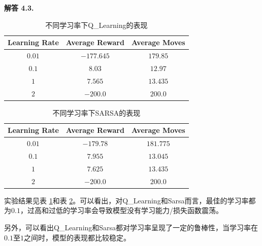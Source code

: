 \documentclass[12pt, a4paper, oneside]{ctexart}
\newenvironment{solution}[1]{\par\noindent\textbf{解答 #1. }\par}{\par}
\begin{document}
\begin{solution}{4.3}
    \begin{table}[htbp]
        \centering
        \begin{tabular}{|c|c|c|}
            \hline
            \textbf{Learning Rate} & \textbf{Average Reward} & \textbf{Average Moves} \\
            \hline
            $0.01$ & $-177.645$ & $179.85$ \\
            \hline
            $0.1$ & $8.03$ & $12.97$ \\
            \hline
            $1$ & $7.565$ & $13.435$ \\
            \hline
            $2$ & $-200.0$ & $200.0$ \\
            \hline
        \end{tabular}
        \caption{不同学习率下Q\_Learning的表现}
        \label{tab:qlearning}
    \end{table}

    \begin{table}[htbp]
        \centering
        \begin{tabular}{|c|c|c|}
            \hline
            \textbf{Learning Rate} & \textbf{Average Reward} & \textbf{Average Moves} \\
            \hline
            $0.01$ & $-179.78$ & $181.775$ \\
            \hline
            $0.1$ & $7.955$ & $13.045$ \\
            \hline
            $1$ & $7.625$ & $13.435$ \\
            \hline
            $2$ & $-200.0$ & $200.0$ \\
            \hline
        \end{tabular}
        \caption{不同学习率下SARSA的表现}
        \label{tab:sarsa}
    \end{table}

    实验结果见表 \ref{tab:qlearning}和表 \ref{tab:sarsa}。可以看出，对Q\_Learning和Sarsa而言，最佳的学习率都为$0.1$，过高和过低的学习率会导致模型没有学习能力/损失函数震荡。\par
    
    另外，可以看出Q\_Learning和Sarsa都对学习率呈现了一定的鲁棒性，当学习率在$0.1$至$1$之间时，模型的表现都比较稳定。
\end{solution}
\end{document}
